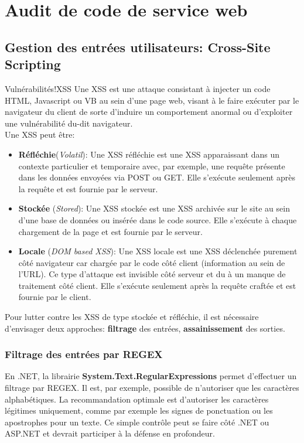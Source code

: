\documentclass[twoside,a4paper,12pt,titlepage]{book}
\begin{document}
\section{Audit de code de service web}
\subsection{Gestion des entrées utilisateurs: Cross-Site Scripting}
\begin{Define}{Vulnérabilités!XSS}
Une \gls{XSS} est une attaque consistant à injecter un code HTML, Javascript ou VB au sein d'une page web, visant à le faire exécuter par le navigateur du client de sorte d'induire un comportement anormal ou d'exploiter une vulnérabilité du-dit navigateur.\\Une XSS peut être:\begin{itemize}
\item \textbf{Réfléchie}(\textit{Volatil}): Une XSS réfléchie est une XSS apparaissant dans un contexte particulier et temporaire avec, par exemple, une requête présente dans les données envoyées via POST ou GET. Elle s'exécute seulement après la requête et est fournie par le serveur.
\item \textbf{Stockée} (\textit{Stored}): Une XSS stockée est une XSS archivée sur le site au sein d'une base de données ou insérée dans le code source. Elle s'exécute à chaque chargement de la page et est fournie par le serveur.
\item \textbf{Locale} (\textit{DOM based XSS}): Une XSS locale est une XSS déclenchée purement côté navigateur car chargée par le code côté client (information au sein de l'URL). Ce type d'attaque est invisible côté serveur et du à un manque de traitement côté client. Elle s'exécute seulement après la requête craftée et est fournie par le client.
\end{itemize}
\end{Define}

Pour lutter contre les XSS de type stockée et réfléchie, il est nécessaire d'envisager deux approches: \textbf{filtrage} des entrées, \textbf{assainissement} des sorties.

\subsubsection{Filtrage des entrées par REGEX}
En .NET, la librairie \textbf{System.Text.RegularExpressions} permet d'effectuer un filtrage par \gls{REGEX}. Il est, par exemple, possible de n'autoriser que les caractères alphabétiques. La recommandation optimale est d'autoriser les caractères légitimes uniquement, comme par exemple les signes de ponctuation ou les apostrophes pour un texte. Ce simple contrôle peut se faire côté .NET ou ASP.NET et devrait participer à la défense en profondeur.
\end{document}
